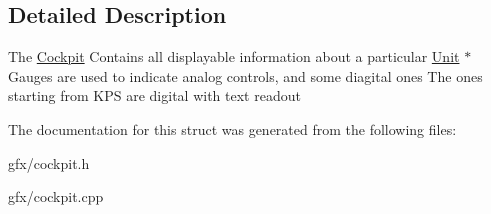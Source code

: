 \subsection{Detailed Description}
The \hyperlink{classCockpit}{Cockpit} Contains all displayable information about a particular \hyperlink{classUnit}{Unit} $\ast$ Gauges are used to indicate analog controls, and some diagital ones The ones starting from K\+PS are digital with text readout 

The documentation for this struct was generated from the following files\+:\begin{DoxyCompactItemize}
\item 
gfx/cockpit.\+h\item 
gfx/cockpit.\+cpp\end{DoxyCompactItemize}
